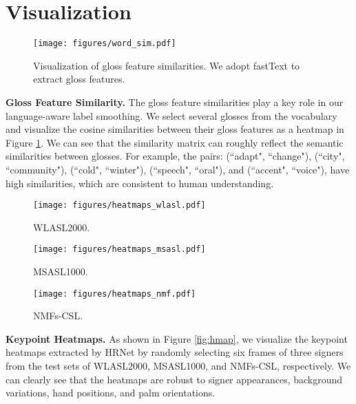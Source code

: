 \documentclass[10pt,twocolumn,letterpaper]{article}
\begin{document}
\section{Visualization}
\begin{figure}[t]
\centering
\texttt{[image: figures/word\_sim.pdf]}
\caption{Visualization of gloss feature similarities. We adopt fastText to extract gloss features.}
\label{fig:word_sim}
\end{figure}

\noindent\textbf{Gloss Feature Similarity.} The gloss feature similarities play a key role in our language-aware label smoothing.
We select several glosses from the vocabulary and visualize the cosine similarities between their gloss features as a heatmap in Figure \ref{fig:word_sim}.
We can see that the similarity matrix can roughly reflect the semantic similarities between glosses.
For example, the pairs: (``adapt", ``change"), (``city", ``community"), (``cold", ``winter"), (``speech", ``oral"), and (``accent", ``voice"), have high similarities, which are consistent to human understanding.


\begin{figure*}[t]
     \centering
     \begin{subfigure}[t]{0.95\textwidth}
         \centering
         \texttt{[image: figures/heatmaps\_wlasl.pdf]}
         \caption{WLASL2000.}
         \label{fig:hmap_wlasl}
     \end{subfigure}

     \begin{subfigure}[t]{0.95\textwidth}
         \centering
         \texttt{[image: figures/heatmaps\_msasl.pdf]}
         \caption{MSASL1000.}
         \label{fig:hmap_msasl}
     \end{subfigure}
     
     \begin{subfigure}[t]{0.95\textwidth}
         \centering
         \texttt{[image: figures/heatmaps\_nmf.pdf]}
         \caption{NMFs-CSL.}
         \label{fig:hmap_nmf}
     \end{subfigure}

\caption{Visualizations for the randomly selected frames and their corresponding keypoint heatmaps estimated by HRNet.}
\label{fig:hmap}
\end{figure*}

\noindent\textbf{Keypoint Heatmaps.} As shown in Figure \ref{fig:hmap}, we visualize the keypoint heatmaps extracted by HRNet \cite{sun2019deep} by randomly selecting six frames of three signers from the test sets of WLASL2000, MSASL1000, and NMFs-CSL, respectively.
We can clearly see that the heatmaps are robust to signer appearances, background variations, hand positions, and palm orientations.
\end{document}
